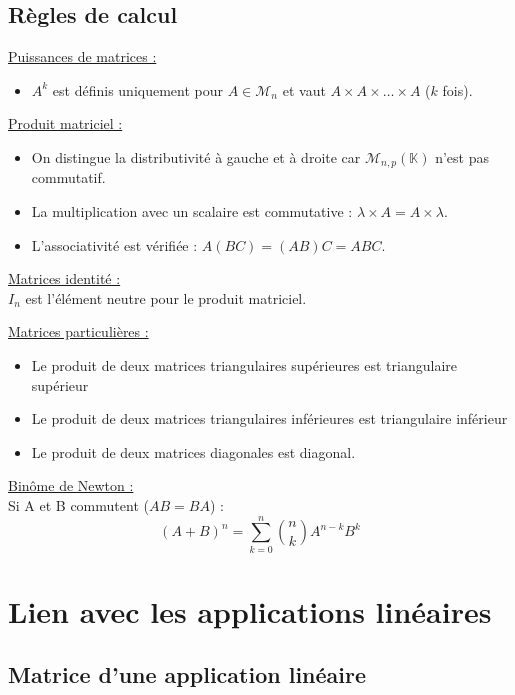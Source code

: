 	\subsection{Règles de calcul}
		
		\underline{Puissances de matrices :}
		\begin{itemize}
			\item $A^k$ est définis uniquement pour $A \in \mathcal{M}_{n}$ et vaut $A \times A \times \dots \times A$ ($k$ fois).\vspace{5pt}
		\end{itemize}
		
		\underline{Produit matriciel :}
		\begin{itemize}
			\item On distingue la distributivité à gauche et à droite car $\mathcal{M}_{n,p}(\mathbb{K})$ n'est pas commutatif.
			\item La multiplication avec un scalaire est commutative : $\lambda \times A = A \times \lambda$.
			\item L'associativité est vérifiée : $A(B C) = (A B) C = ABC$.\vspace{5pt}
		\end{itemize}
		
		\underline{Matrices identité :}\\
		$I_n$ est l'élément neutre pour le produit matriciel.\vspace{5pt}
		
		\underline{Matrices particulières :}
		\begin{itemize}
			\item Le produit de deux matrices triangulaires supérieures est triangulaire supérieur
			\item Le produit de deux matrices triangulaires inférieures est triangulaire inférieur
			\item Le produit de deux matrices diagonales est diagonal\vspace{5pt}.
		\end{itemize}
		
		\underline{Binôme de Newton :}\\
		Si A et B commutent ($AB = BA$) :
		\[ (A + B)^n = \sum_{k=0}^{n} \binom{n}{k} A^{n-k} B^k \]


\section{Lien avec les applications linéaires}
	
	\subsection{Matrice d'une application linéaire}
		
